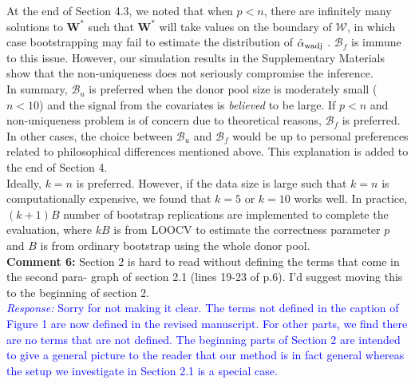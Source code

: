 \documentclass[12pt]{article}
\newcommand{\response}[1]{\noindent \textcolor{blue}{\emph{Response:} #1}}
\begin{document}
{At the end of Section 4.3, we noted that when $p < n$, there are infinitely many solutions to $\mathbf{W}^*$ such that $\mathbf{W}^*$ will take values on the boundary of $\mathcal{W}$, in which case bootstrapping may fail to estimate the distribution of $\hat{\alpha}_{\rm wadj}$ \citep{andrews2000inconsistency}. $\mathcal{B}_f$  is immune to this issue. However, our simulation results in the Supplementary Materials show that the non-uniqueness does not seriously compromise the inference. \\



In summary, $\mathcal{B}_u$ is preferred when  the donor pool size is moderately small ($n< 10$) and the signal from the covariates is \emph{believed} to be large. If $p < n$ and non-uniqueness problem is of concern due to theoretical reasons,  $\mathcal{B}_f$ is preferred. In other cases, the choice between  $\mathcal{B}_u$  and  $\mathcal{B}_f$ would be up to personal preferences related to philosophical differences mentioned above. This explanation is added to the end of Section 4.  \\

Ideally, $k=n$ is preferred. However, if the data size is large such that $k=n$ is computationally expensive, we found that $k = 5$ or $k = 10$ works well. In practice, $(k+1) B$ number of bootstrap replications are implemented to complete the evaluation, where $k B$ is from LOOCV to estimate the correctness parameter $p$ and $B$ is from ordinary bootstrap using the whole donor pool. } \\

{\bf Comment 6:} Section 2 is hard to read without defining the terms that come in the second para- graph of section 2.1 (lines 19-23 of p.6). I'd suggest moving this to the beginning of section 2. \\

\response{Sorry for not making it clear. The terms not defined in the caption of Figure 1 are now defined in the revised manuscript. For other parts, we find there are no terms that are not defined. The beginning parts of Section 2 are intended to give a general picture to the reader that our method is in fact general whereas the setup we investigate in Section 2.1 is a special case. }


\end{document}

